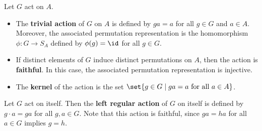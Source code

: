  Let $G$ act on $A$.
\begin{itemize}
    \item The \textbf{trivial action} of $G$ on $A$ is defined by $ga = a$ for all $g \in G$ and $a \in A$. Moreover, the associated permutation representation is the homomorphism $\phi : G \to S_A$ defined by $\phi(g) = \id$ for all $g \in G$.
    \item If distinct elements of $G$ induce distinct permutations on $A$, then the action is \textbf{faithful}. In this case, the associated permutation representation is injective.
    \item The \textbf{kernel} of the action is the set $\set{g \in G \mid ga = a \text{ for all } a \in A}$.
\end{itemize}

 Let $G$ act on itself. Then the \textbf{left regular action} of $G$ on itself is defined by $g \cdot a = ga$ for all $g, a \in G$. Note that this action is faithful, since $ga = ha$ for all $a \in G$ implies $g = h$.
